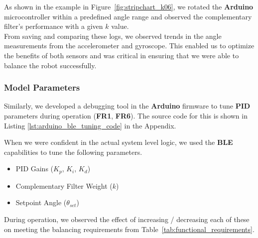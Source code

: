 \documentclass{article}
\begin{document}
\begin{minipage}{\linewidth}
    As shown in the example in Figure~\ref{fig:stripchart_k06}, we rotated the \textbf{Arduino} microcontroller within a predefined angle range
    and observed the complementary filter's performance with a given $k$ value. \\

    From saving and comparing these logs, we observed trends in the
    angle measurements from the accelerometer and gyroscope. This enabled us to optimize the benefits of both sensors and
    was critical in ensuring that we were able to balance the robot successfully.
\end{minipage}

\subsubsection{Model Parameters}

\begin{minipage}{\linewidth}
    Similarly, we developed a debugging tool in the \textbf{Arduino} firmware to tune \textbf{PID} parameters during operation (\textbf{FR1}, \textbf{FR6}).
    The source code for this is shown in Listing \ref{lst:arduino_ble_tuning_code} in the Appendix. \\
\end{minipage}

\begin{minipage}{\linewidth}
    When we were confident in the actual system level logic, we used the \textbf{BLE} capabilities to tune the following parameters. \\
\end{minipage}

\begin{itemize}
    \item PID Gains ($K_p$, $K_i$, $K_d$)
    \item Complementary Filter Weight ($k$)
    \item Setpoint Angle ($\theta_{set}$)
\end{itemize}

\begin{minipage}{\linewidth}
    During operation, we observed the effect of increasing / decreasing each of these on meeting the balancing requirements from
    Table~\ref{tab:functional_requirements}. \\
\end{minipage}
\end{document}
